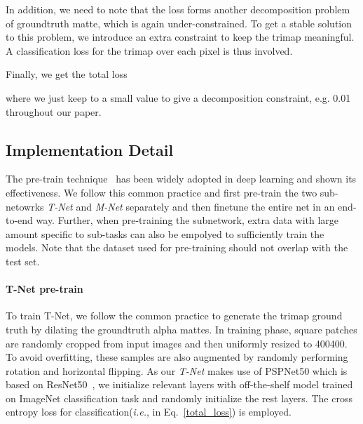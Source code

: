 In addition, we need to note that the loss  forms another decomposition problem of groundtruth matte, which is again under-constrained.
To get a stable solution to this problem, we introduce an extra constraint to keep the trimap meaningful.
A classification loss  for the trimap over each pixel is thus involved.


Finally, we get the total loss

where we just keep  to a small value to give a decomposition constraint, e.g. 0.01 throughout our paper.


\subsection{Implementation Detail}\label{sec_implementaton}

The pre-train technique~\cite{hinton2006fast} has been widely adopted in deep learning and shown its effectiveness.
We follow this common practice and first pre-train the two sub-netowrks \emph{T-Net} and \emph{M-Net} separately and then finetune the entire net in an end-to-end way.
Further, when pre-training the subnetwork, extra data with large amount specific to sub-tasks can also be empolyed to sufficiently train the models.
Note that the dataset used for pre-training should not overlap with the test set.

\paragraph{\textbf{T-Net pre-train}}
To train T-Net, we follow the common practice to generate the trimap ground truth by dilating the groundtruth alpha mattes.
In training phase, square patches are randomly cropped from input images and then uniformly resized to 400400.
To avoid overfitting, these samples are also augmented by randomly performing rotation and horizontal flipping.
As our \emph{T-Net} makes use of PSPNet50 which is based on ResNet50~\cite{he2016deep}, we initialize relevant layers with off-the-shelf model trained on ImageNet classification task and randomly initialize the rest layers.
The cross entropy loss for classification(\emph{i.e.},  in Eq.~\ref{total_loss}) is employed.



